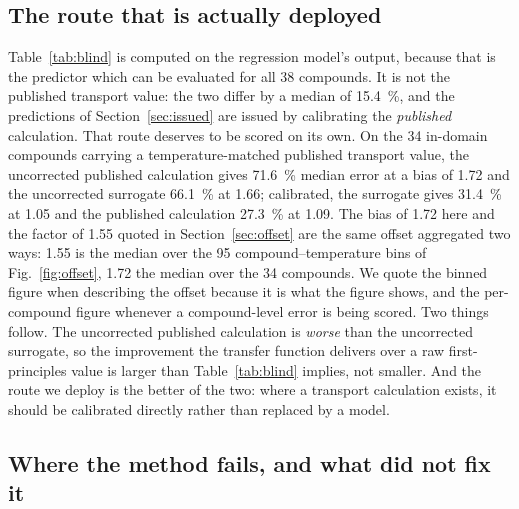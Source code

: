 \subsection{The route that is actually deployed}
\label{sec:deployed}

Table~\ref{tab:blind} is computed on the regression model's output, because that is the predictor
which can be evaluated for all \num{38} compounds. It is not the published transport value: the two
differ by a median of \SI{15.4}{\percent}, and the predictions of Section~\ref{sec:issued} are
issued by calibrating the \emph{published} calculation. That route deserves to be scored on its
own. On the \num{34} in-domain compounds carrying a temperature-matched published transport value,
the uncorrected published calculation gives \SI{71.6}{\percent} median error at a bias of \num{1.72}
and the uncorrected surrogate \SI{66.1}{\percent} at \num{1.66}; calibrated, the surrogate gives
\SI{31.4}{\percent} at \num{1.05} and the published calculation \SI{27.3}{\percent} at \num{1.09}.
The bias of \num{1.72} here and the factor of \num{1.55} quoted in Section~\ref{sec:offset} are the
same offset aggregated two ways: \num{1.55} is the median over the \num{95} compound--temperature
bins of Fig.~\ref{fig:offset}, \num{1.72} the median over the \num{34} compounds. We quote the
binned figure when describing the offset because it is what the figure shows, and the per-compound
figure whenever a compound-level error is being scored.
Two things follow. The uncorrected published calculation is \emph{worse} than the uncorrected
surrogate, so the improvement the transfer function delivers over a raw first-principles value is
larger than Table~\ref{tab:blind} implies, not smaller. And the route we deploy is the better of the
two: where a transport calculation exists, it should be calibrated directly rather than replaced by
a model.

\subsection{Where the method fails, and what did not fix it}
\label{sec:failure}
\label{sec:rejected}

